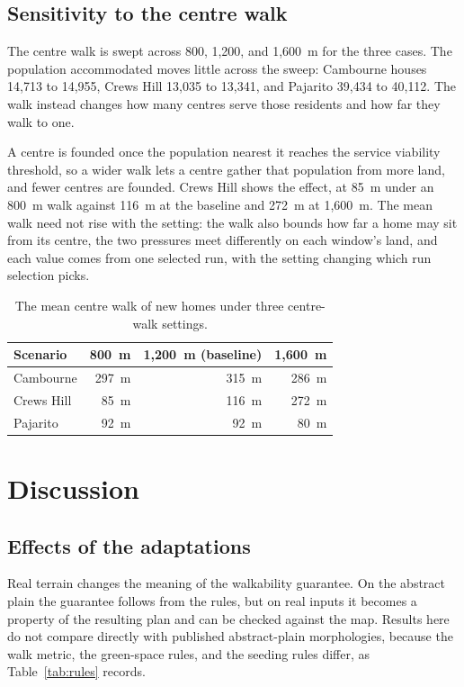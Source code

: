 \documentclass[11pt]{article}
\begin{document}
\subsection{Sensitivity to the centre walk}

The centre walk is swept across 800, 1{,}200, and 1{,}600~m for the
three cases. The population accommodated moves little across the
sweep: Cambourne houses 14{,}713 to 14{,}955, Crews Hill 13{,}035
to 13{,}341, and Pajarito 39{,}434 to 40{,}112. The walk instead
changes how many centres serve those residents and how far they
walk to one.

A centre is founded once the population nearest it reaches the
service viability threshold, so a wider walk lets a centre gather that
population from more land, and fewer centres are founded. Crews
Hill shows the effect, at 85~m under an 800~m walk against 116~m
at the baseline and 272~m at 1{,}600~m. The mean walk need not rise
with the setting: the walk also bounds how far a home may sit from
its centre, the two pressures meet differently on each window's
land, and each value comes from one selected run, with the setting
changing which run selection picks.

\begin{table}[t]
  \centering
  \caption{The mean centre walk of new homes under three centre-walk
  settings.}
  \label{tab:sweep}
  \small
  \begin{tabular}{l r r r}
    \toprule
    Scenario & 800~m & 1{,}200~m (baseline) & 1{,}600~m \\
    \midrule
    Cambourne & 297~m & 315~m & 286~m \\
    Crews Hill & 85~m & 116~m & 272~m \\
    Pajarito & 92~m & 92~m & 80~m \\
    \bottomrule
  \end{tabular}
\end{table}

\section{Discussion}
\label{sec:discussion}

\subsection{Effects of the adaptations}

Real terrain changes the meaning of the walkability guarantee. On
the abstract plain the guarantee follows from the rules, but on
real inputs it becomes a property of the resulting plan and can
be checked against the map. Results here do not compare directly
with published abstract-plain morphologies, because the walk metric,
the green-space rules, and the seeding rules differ, as
Table~\ref{tab:rules} records.
\end{document}
